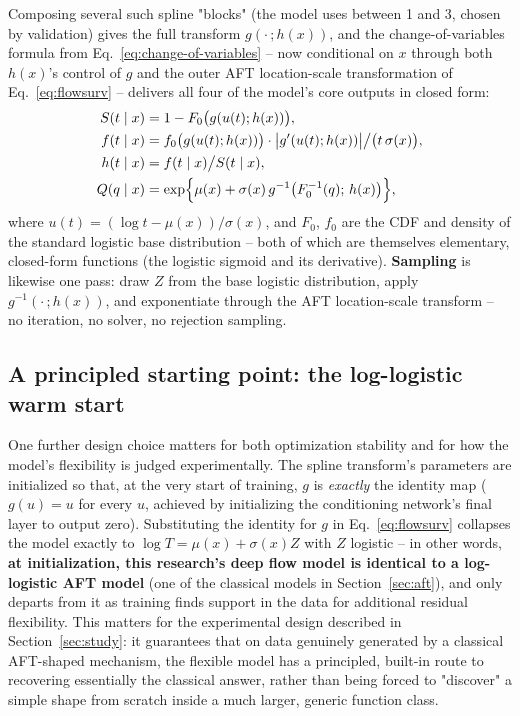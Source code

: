\documentclass[11pt]{article}
\begin{document}
Composing several such spline "blocks" (the model uses between 1 and 3,
chosen by validation) gives the full transform $g(\cdot\,; h(x))$, and
the change-of-variables formula from
Eq.~\eqref{eq:change-of-variables} -- now conditional on $x$ through both
$h(x)$'s control of $g$ and the outer AFT location-scale transformation
of Eq.~\eqref{eq:flowsurv} -- delivers all four of the model's core
outputs in closed form:
\begin{align}
  S(t \mid x) &= 1 - F_0\bigl(g(u(t); h(x))\bigr), \\
  f(t \mid x) &= f_0\bigl(g(u(t); h(x))\bigr)\cdot\bigl|g'(u(t); h(x))\bigr| \big/ \bigl(t\,\sigma(x)\bigr), \\
  h(t \mid x) &= f(t\mid x) \big/ S(t \mid x), \\
  Q(q \mid x) &= \exp\Bigl\{\mu(x) + \sigma(x)\, g^{-1}\bigl(F_0^{-1}(q);\, h(x)\bigr)\Bigr\},
\end{align}
where $u(t) = (\log t - \mu(x))/\sigma(x)$, and $F_0$, $f_0$ are the CDF
and density of the standard logistic base distribution -- both of which
are themselves elementary, closed-form functions (the logistic sigmoid
and its derivative). \textbf{Sampling} is likewise one pass: draw $Z$
from the base logistic distribution, apply $g^{-1}(\cdot\,; h(x))$, and
exponentiate through the AFT location-scale transform -- no iteration,
no solver, no rejection sampling.

\subsection{A principled starting point: the log-logistic warm start}
One further design choice matters for both optimization stability and
for how the model's flexibility is judged experimentally. The spline
transform's parameters are initialized so that, at the very start of
training, $g$ is \emph{exactly} the identity map ($g(u) = u$ for every
$u$, achieved by initializing the conditioning network's final layer to
output zero). Substituting the identity for $g$ in
Eq.~\eqref{eq:flowsurv} collapses the model exactly to
$\log T = \mu(x) + \sigma(x) Z$ with $Z$ logistic -- in other words,
\textbf{at initialization, this research's deep flow model is
identical to a log-logistic AFT model} (one of the classical models in
Section~\ref{sec:aft}), and only departs from it as training finds
support in the data for additional residual flexibility. This matters
for the experimental design described in Section~\ref{sec:study}: it
guarantees that on data genuinely generated by a classical AFT-shaped
mechanism, the flexible model has a principled, built-in route to
recovering essentially the classical answer, rather than being forced to
"discover" a simple shape from scratch inside a much larger, generic
function class.
\end{document}
